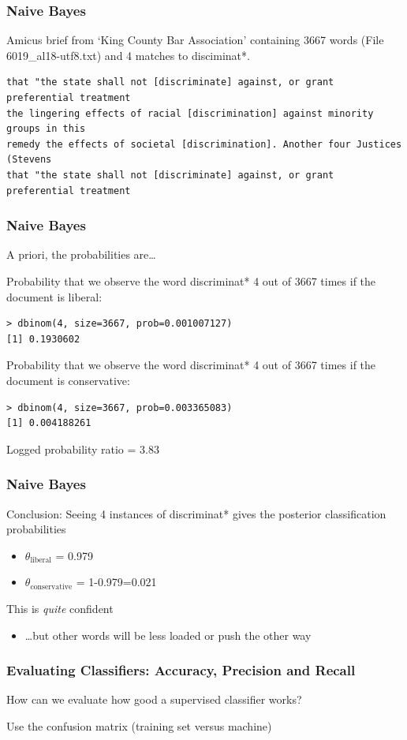 \documentclass[11pt,compress,professionalfonts]{beamer}
\newcommand{\ita}{\begin{itemize}}
\newcommand{\itm}{\item[]}
\newcommand{\itz}{\end{itemize}}
\begin{document}
\begin{frame}[t,fragile]\frametitle{Naive Bayes}

Amicus brief from `King County Bar Association' containing 3667 words (File 6019\_al18-utf8.txt) and 4 matches to disciminat*.

{\footnotesize
\begin{verbatim}
that "the state shall not [discriminate] against, or grant preferential treatment
the lingering effects of racial [discrimination] against minority groups in this
remedy the effects of societal [discrimination]. Another four Justices (Stevens
that "the state shall not [discriminate] against, or grant preferential treatment
\end{verbatim}
}
\end{frame}
\begin{frame}[t,fragile]\frametitle{Naive Bayes}

A priori, the probabilities are\ldots

Probability that we observe the word  discriminat* 4 out of 3667 times if the document is liberal:
{\small
\begin{verbatim}
> dbinom(4, size=3667, prob=0.001007127)
[1] 0.1930602
\end{verbatim}
}

Probability that we observe the word  discriminat* 4 out of 3667 times if the document is conservative:
{\small
\begin{verbatim}
> dbinom(4, size=3667, prob=0.003365083)
[1] 0.004188261
\end{verbatim}
}

Logged probability ratio = 3.83

\newpage

\end{frame}
\begin{frame}[t,fragile]\frametitle{Naive Bayes}

Conclusion: Seeing 4 instances of discriminat* gives the posterior classification probabilities
\ita
\itm $\theta_\text{liberal}$ = 0.979
\itm $\theta_\text{conservative}$ =  1-0.979=0.021
\itz

This is \textit{quite} confident
\ita
\itm \ldots but other words will be less loaded or push the other way
\itz





\end{frame}
\begin{frame}[t,fragile]\frametitle{Evaluating Classifiers: Accuracy, Precision and Recall}

How can we evaluate how good a supervised classifier works?

Use the confusion matrix (training set versus machine)


\end{frame}
\end{document}
